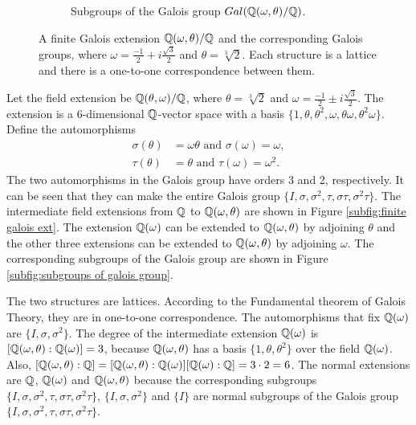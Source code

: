 \documentclass[../main.tex]{subfiles}
\begin{document}
\begin{figure}[!ht]
\begin{subfigure}[t]{0.48\textwidth}
		\caption{Subgroups of the Galois group $Gal(\mathbb{Q}(\omega,\theta)/\mathbb{Q})$.}
		\label{subfig:subgroups of galois group 2}
	\end{subfigure}
	\caption{A finite Galois extension $\mathbb{Q}(\omega,\theta)/\mathbb{Q}$ and the corresponding Galois groups, where $\omega=\frac{-1}{2}+i\frac{\sqrt{3}}{2}$ and $\theta=\sqrt[3]{2}$. Each structure is a lattice and there is a one-to-one correspondence between them.}
	\label{fig:galois ext and groups example2}
\end{figure}

\begin{example}
Let the field extension be $\mathbb{Q}(\theta,\omega)/\mathbb{Q}$, where $\theta=\sqrt[3]{2}$ and $\omega=\frac{-1}{2}\pm i\frac{\sqrt{3}}{2}$. %
The extension is a 6-dimensional $\mathbb{Q}$-vector space with a basis $\{1,\theta,\theta^2,\omega,\theta\omega,\theta^2\omega\}$.
Define the automorphisms 
\begin{align*}
    \sigma(\theta)&=\omega\theta \text{ and } \sigma(\omega)=\omega,\\
    \tau(\theta)&=\theta \text{ and } \tau(\omega)=\omega^2.
\end{align*}
The two automorphisms in the Galois group have orders 3 and 2, respectively. It can be seen that they can make the entire Galois group $\{I,\sigma,\sigma^2,\tau,\sigma\tau,\sigma^2\tau\}$. The intermediate field extensions from $\mathbb{Q}$ to $\mathbb{Q}(\omega,\theta)$ are shown in Figure \ref{subfig:finite galois ext}. The extension $\mathbb{Q}(\omega)$ can be extended to $\mathbb{Q}(\omega,\theta)$ by adjoining $\theta$ and the other three extensions can be extended to $\mathbb{Q}(\omega,\theta)$ by adjoining $\omega$. The corresponding subgroups of the Galois group are shown in Figure \ref{subfig:subgroups of galois group}.

The two structures are lattices. %
According to the Fundamental theorem of Galois Theory, they are in one-to-one correspondence. The automorphisms that fix $\mathbb{Q}(\omega)$ are $\{I,\sigma,\sigma^2\}$. The degree of the intermediate extension $\mathbb{Q}(\omega)$ is $[\mathbb{Q}(\omega,\theta):\mathbb{Q}(\omega)]=3$, because $\mathbb{Q}(\omega,\theta)$ has a basis $\{1,\theta,\theta^2\}$ over the field $\mathbb{Q}(\omega)$. Also, $[\mathbb{Q}(\omega,\theta):\mathbb{Q}]=[\mathbb{Q}(\omega,\theta):\mathbb{Q}(\omega)][\mathbb{Q}(\omega):\mathbb{Q}]=3\cdot 2=6$. The normal extensions are $\mathbb{Q}$, $\mathbb{Q}(\omega)$ and $\mathbb{Q}(\omega,\theta)$ because the corresponding subgroups $\{I,\sigma,\sigma^2,\tau,\sigma\tau,\sigma^2\tau\}$, $\{I,\sigma,\sigma^2\}$ and $\{I\}$ are normal subgroups of the Galois group $\{I,\sigma,\sigma^2,\tau,\sigma\tau,\sigma^2\tau\}$.
\end{example}
\end{document}
